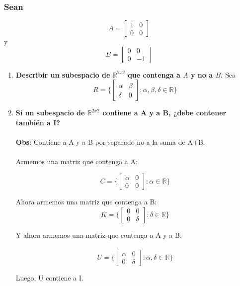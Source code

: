 \documentclass{article}
\begin{document}
\subsubsection{Sean }
\[
A =
\begin{bmatrix}
1 & 0 \\
0 & 0
\end{bmatrix}
\]
y
\[
B =
\begin{bmatrix}
0 & 0 \\
0 & -1
\end{bmatrix}
\]
\begin{enumerate}
\item \textbf{Describir un subespacio de $\mathbb{R}^{2x2}$ que contenga a $A$ y no a $B$.}
	Sea \[
	R = \Bigg \lbrace
	\begin{bmatrix}
	\alpha & \beta \\
	\delta & 0
	\end{bmatrix} :
	\alpha,\beta,\delta \in \mathbb{R}
	\Bigg\rbrace
	\]

\item \textbf{Si un subespacio de $\mathbb{R}^{2x2}$ contiene a A y a B, ¿debe contener también a I?} \\ \\
\textbf{Obs}: Contiene a A y a B por separado no a la suma de A+B. \\ \\
Armemos una matriz que contenga a A: 

\[
C = 
\Bigg\lbrace
\begin{bmatrix}
\alpha & 0\\
0 & 0
\end{bmatrix} :
\alpha \in \mathbb{R}
\Bigg\rbrace
\]

Ahora armemos una matriz que contenga a B:
\[
K = 
\Bigg\lbrace
\begin{bmatrix}
0 & 0\\
0 & \delta
\end{bmatrix} :
\delta \in \mathbb{R}
\Bigg\rbrace
\]


Y ahora armemos una matriz que contenga a A y a B: \\ \\
\[
U = 
\Bigg\lbrace
\begin{bmatrix}
\alpha & 0\\
0 & \delta
\end{bmatrix} :
\alpha, \delta \in \mathbb{R}
\Bigg\rbrace
\]

Luego, U contiene a I.
\end{enumerate}
\end{document}
